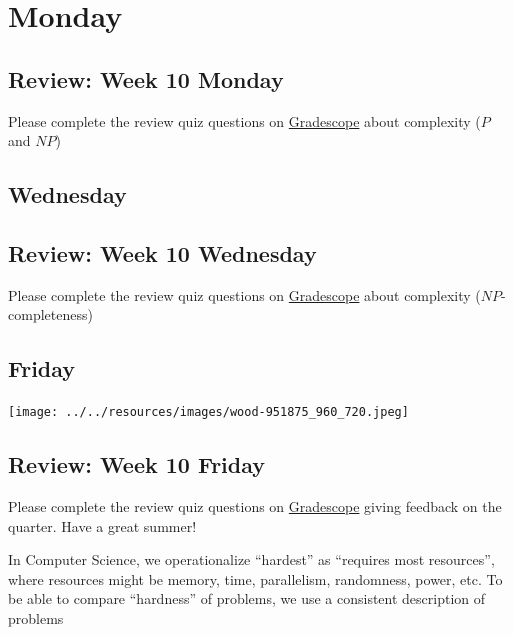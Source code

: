 \newpage

\section*{Monday}



\subsection*{Review: Week 10 Monday}

Please complete the review quiz questions on \href{http://gradescope.com}{Gradescope} about 
complexity ($P$ and $NP$)


\newpage
\subsection*{Wednesday}



\subsection*{Review: Week 10 Wednesday}

Please complete the review quiz questions on \href{http://gradescope.com}{Gradescope} about 
complexity ($NP$-completeness)

\newpage
\subsection*{Friday}



\newpage


\vfill

\begin{center}
\texttt{[image: ../../resources/images/wood-951875\_960\_720.jpeg]}
\end{center}

\vfill

\subsection*{Review: Week 10 Friday}

Please complete the review quiz questions on \href{http://gradescope.com}{Gradescope} giving feedback on the quarter. 
Have a great summer!
\newpage


In Computer Science, we operationalize ``hardest'' as ``requires most resources'', where
resources might be memory, time, parallelism, randomness, power, etc.
To be able to compare ``hardness'' of problems, we use a consistent description of problems

